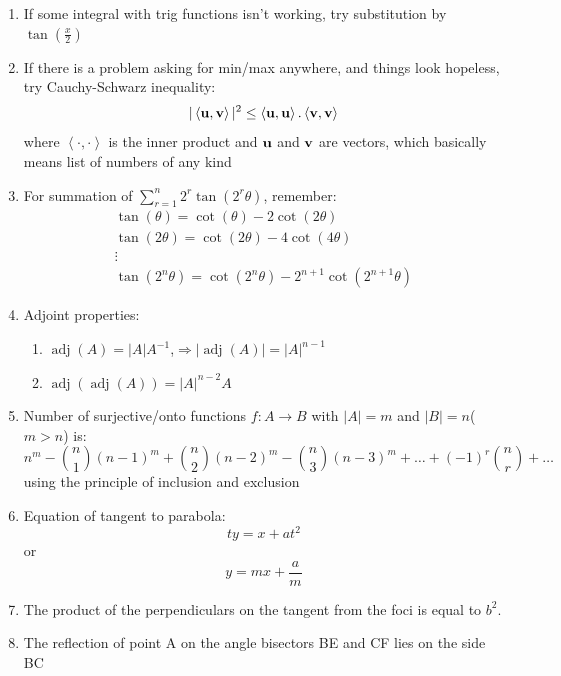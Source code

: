 \documentclass{article}
\numberwithin{equation}{section}
\numberwithin{figure}{section}
\DeclareMathOperator{\adj}{adj}
\newcommand{\Det}[1]{|#1|}
\begin{document}
\begin{enumerate}
		\item If some integral with trig functions isn't working, try substitution by $\tan(\frac{x}{2})$

		\item If there is a problem asking for min/max anywhere, and things look hopeless, try Cauchy-Schwarz inequality:
			\begin{equation}
				|\left<\bf{u},\bf{v}\right>|^2\leq \left<\bf{u},\bf{u}\right>.\left<\bf{v},\bf{v}\right>
			\end{equation}
		where $\left<\cdot, \cdot \right>$ is the inner product and $\bf{u}$ and $\bf{v}$ are vectors, which basically means list of numbers of any kind
		\item For summation of $\sum_{r=1}^n 2^r \tan(2^{r}\theta)$, remember:
			\begin{align}
				\tan(\theta)=\cot(\theta)-2\cot(2\theta)\\
				\tan(2\theta)=\cot(2\theta)-4\cot(4\theta)\\
				\vdots\\
				\tan(2^n\theta)=\cot(2^n\theta)-2^{n+1}\cot(2^{n+1}\theta)
			\end{align}
		\item Adjoint properties:
			\begin{enumerate}
				\item $\adj(A)=\Det{A}A^{-1}$,$\Rightarrow \Det{\adj(A)}=\Det{A}^{n-1}$
				\item $\adj(\adj(A))=\Det{A}^{n-2} A$
			\end{enumerate}
		\item Number of surjective/onto functions $f:A\rightarrow B$ with $\Det{A}=m$ and $\Det{B}=n$($m>n$) is:
			\begin{equation}
				n^m-{n \choose 1}{(n-1)^m}+{n \choose 2}{(n-2)^m}-{n \choose 3}{(n-3)^m}+\dots+(-1)^r{n \choose r}+\dots
			\end{equation}
			using the principle of inclusion and exclusion
		\item Equation of tangent to parabola:
			\begin{equation}
				ty=x+at^2
			\end{equation}
			or 
			\begin{equation}
				y=mx+\frac{a}{m}
			\end{equation}
		\item The product of the perpendiculars on the tangent from the foci is equal to $b^2$.
		\item The reflection of point A on the angle bisectors BE and CF lies on the side BC

\end{enumerate}
\end{document}
